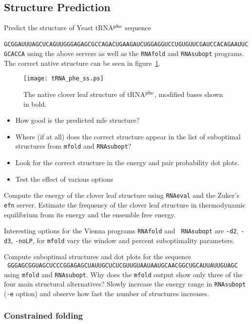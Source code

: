 \documentclass{article}
\begin{document}
\subsection{Structure Prediction}

Predict the structure of Yeast tRNA$^{\rm phe}$ sequence\\
{\small\tt
GCGGAUUUAGCUCAGUUGGGAGAGCGCCAGACUGAAGAUCUGGAGGUCCUGUGUUCGAUCCACAGAAUUCGCACCA}
using the above servers as well as the {\tt RNAfold} and {\tt RNAsubopt}
programs. The correct native structure can be seen in
figure~\ref{fig:tRNAsec}. 

\begin{figure}[ht]
\centerline{
\texttt{[image: tRNA\_phe\_ss.ps]}}
\caption{The native clover leaf structure of tRNA$^{\rm phe}$, modified
bases shown in bold.} 
\label{fig:tRNAsec}
\end{figure}

\begin{itemize}
\item How good is the predicted mfe structure?
\item Where (if at all) does the correct structure appear in the list of
suboptimal structures from {\tt mfold} and {\tt RNAsubopt}?
\item Look for the correct structure in the energy and pair probability
dot plots.
\item Test the effect of various options
\end{itemize}

Compute the energy of the clover leaf structure using {\tt RNAeval} and the
Zuker's {\tt efn} server. Estimate the frequency of the clover leaf
structure in thermodynamic equilibrium from its energy and the ensemble free
energy.

Interesting options for the Vienna programs {\tt RNAfold} and {\tt
RNAsubopt} are {\tt -d2}, {\tt -d3}, {\tt -noLP}, for {\tt mfold} vary the
window and percent suboptimality parameters.

Compute suboptimal structures and dot plots for the sequence\\
{\small\tt
GGGAGCGGUAGCUCCCGGAGAGCUAUUGCUCUCGUUGUAAUAAUGCAACGGCUGCAUUAUUGUAGC}\\
using {\tt mfold} and {\tt RNAsubopt}.
Why does the {\tt mfold} output show only three of the four main structural
alternatives? Slowly increase the energy range in {\tt RNAsubopt} ({\tt -e}
option) and observe how fast the number of structures increases.


\subsubsection{Constrained folding}
\end{document}
